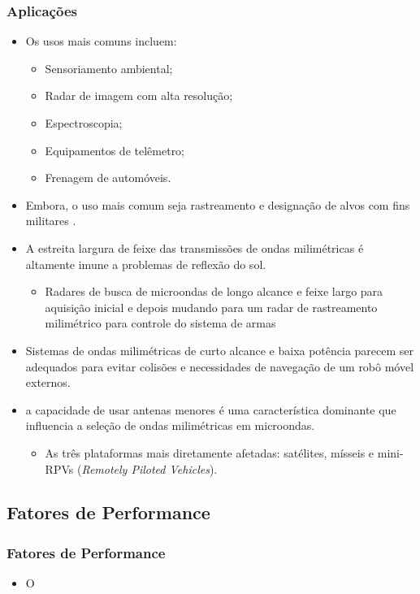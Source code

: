 \documentclass[xcolor=dvipsnames, aspectratio=169]{beamer}
\begin{document}
    \begin{frame}
    \frametitle{Aplicações}
        \begin{itemize}
            \item Os usos mais comuns incluem:
            \begin{itemize}
                \item Sensoriamento ambiental;
                \item Radar de imagem com alta resolução;
                \item Espectroscopia;
                \item Equipamentos de telêmetro;
                \item Frenagem de automóveis.
            \end{itemize}
            \item Embora, o uso mais comum seja rastreamento e designação de alvos com fins militares \cite{everett1995sensors}.
            \item A estreita largura de feixe das transmissões de ondas milimétricas é altamente
            imune a problemas de reflexão do sol.
            \begin{itemize}
                \item Radares de busca de microondas de longo alcance
                e feixe largo para aquisição inicial e depois mudando para um radar de rastreamento
                milimétrico para controle do sistema de armas
            \end{itemize}
            \item Sistemas de ondas milimétricas de curto alcance e baixa potência parecem ser
            adequados para evitar colisões e necessidades de navegação de um robô móvel
            externos.
            \item a capacidade de usar antenas menores é uma característica
            dominante que influencia a seleção de ondas milimétricas em microondas. 
            \begin{itemize}
                \item As três plataformas mais diretamente afetadas: satélites, mísseis e mini-RPVs (\textit{Remotely Piloted Vehicles}).
            \end{itemize}
        \end{itemize}
    \end{frame}

    \subsection[Introdução]{Fatores de Performance} 
    \begin{frame}
    \frametitle{Fatores de Performance}
        \begin{itemize}
            \item O
        \end{itemize}
    \end{frame}
\end{document}
